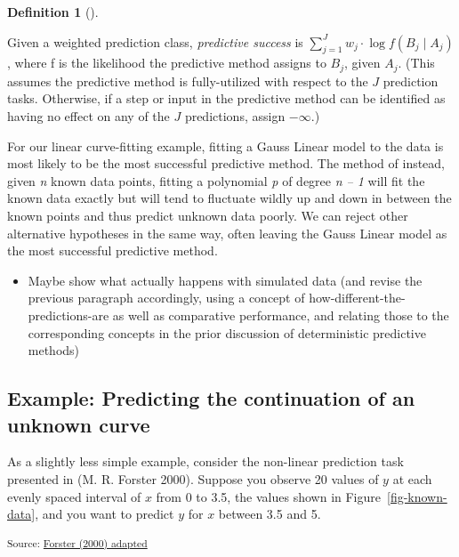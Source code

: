 \documentclass[
  letterpaper,
  DIV=11,
  numbers=noendperiod]{scrartcl}
\providecommand{\tightlist}{%
  \setlength{\itemsep}{0pt}\setlength{\parskip}{0pt}}\usepackage{longtable,booktabs,array}
\theoremstyle{definition}
\newtheorem{definition}{Definition}[section]
\theoremstyle{remark}
\begin{document}
\begin{definition}[]\protect\hypertarget{def-success}{}\label{def-success}

Given a weighted prediction class, \emph{predictive success} is
\(\sum_{j=1}^{J} w_j \cdot \log f(B_j \mid A_j)\), where f is the
likelihood the predictive method assigns to \(B_j\), given \(A_j\).
(This assumes the predictive method is fully-utilized with respect to
the \(J\) prediction tasks. Otherwise, if a step or input in the
predictive method can be identified as having no effect on any of the
\(J\) predictions, assign \(-\infty\).)

\end{definition}

For our linear curve-fitting example, fitting a Gauss Linear model to
the data is most likely to be the most successful predictive method. The
method of instead, given \emph{n} known data points, fitting a
polynomial \emph{p} of degree \emph{n -- 1} will fit the known data
exactly but will tend to fluctuate wildly up and down in between the
known points and thus predict unknown data poorly. We can reject other
alternative hypotheses in the same way, often leaving the Gauss Linear
model as the most successful predictive method.

\begin{itemize}
\tightlist
\item
  Maybe show what actually happens with simulated data (and revise the
  previous paragraph accordingly, using a concept of
  how-different-the-predictions-are as well as comparative performance,
  and relating those to the corresponding concepts in the prior
  discussion of deterministic predictive methods)
\end{itemize}

\subsection{Example: Predicting the continuation of an unknown
curve}\label{example-predicting-the-continuation-of-an-unknown-curve}

As a slightly less simple example, consider the non-linear prediction
task presented in (M. R. Forster 2000). Suppose you observe 20 values of
\(y\) at each evenly spaced interval of \(x\) from 0 to 3.5, the values
shown in Figure~\ref{fig-known-data}, and you want to predict \(y\) for
\(x\) between 3.5 and 5.

\textsubscript{Source:
\href{https://hugetim.github.io/justify-predictive/notebooks/forster2000_adapted-preview.html\#cell-fig-known-data}{Forster
(2000) adapted}}
\end{document}
